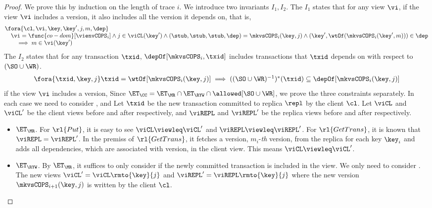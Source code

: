 \begin{proof}
    We prove this by induction on the length of trace \( i \).
    We introduce two invariants \( I_1, I_2 \).
    The \( I_1 \) states that for any view \( \vi \), if the view \( \vi \) includes a version, 
    it also includes all the version it depends on, that is,
    \[
        \begin{array}{@{}l@{}}
        \fora{\cl, \vi,\key,\key',j,m,\dep} \\
        \quad \vi = \func{co-dom}[\vienvCOPS_i] \land j \in \viCL(\key') 
        \land (\stub,\stub,\stub,\dep) = \mkvsCOPS_i(\key,j)
        \land (\key',\wtOf(\mkvsCOPS_i(\key',m))) \in \dep \\
        \qquad \implies m \in \vi(\key')
        \end{array}
    \]
    The \( I_2 \) states that for any transaction \( \txid \), 
    \( \depOf[\mkvsCOPS_i,\txid] \) includes transactions that \( \txid \) depends on
    with respect to \( (\SO \cup \WR) \).
    \[
        \begin{array}{@{}l@{}}
        \fora{\txid,\key,j} 
        \txid = \wtOf[\mkvsCOPS_i(\key,j)]
        \implies 
        ((\SO \cup \WR)^{-1})^*(\txid) \subseteq \depOf[\mkvsCOPS_i(\key,j)]
        \end{array}
    \]
    if the view \( \vi \) includes a version, 
    Since \( \ET_\CC = \ET_\MR \cap \ET_\RYW \cap \allowed[\SO \cup \WR] \), we prove the three constraints separately.
    In each case we need to consider ,  and 
    Let \( \txid \) be the new transaction committed to replica \( \repl \) by the client \( \cl \).
    Let \( \viCL \) and \( \viCL' \) be the client views before and after respectively,
    and \( \viREPL \) and \( \viREPL' \) be the replica views before and after respectively.
    \begin{itemize}
        \item \( \ET_\MR \). 
            For \( \rl{Put} \), it is easy to see \( \viCL \viewleq \viCL' \) and \( \viREPL \viewleq \viREPL' \).
            For \( \rl{GetTrans} \), it is known that \( \viREPL = \viREPL' \). 
            In the premiss of \( \rl{GetTrans} \),
            it fetches a version, \( m_i \)-\emph{th} version, from the replica for each key \( \key_i \) and adds all dependencies, which are associated with version, in the client view.
            This means \( \viCL \viewleq \viCL' \).

        \item \( \ET_\RYW \). 
            By \( \ET_\MR \), it suffices to only consider 
            if the newly committed transaction is included in the view.
            We only need to consider .
            The new views \( \viCL' = \viCL\rmto{\key}{j} \) and \( \viREPL' = \viREPL\rmto{\key}{j} \)
            where the new version \( \mkvsCOPS_{i+1}(\key,j)\) is written by the client \( \cl \).
            

\end{itemize}
\end{proof}
